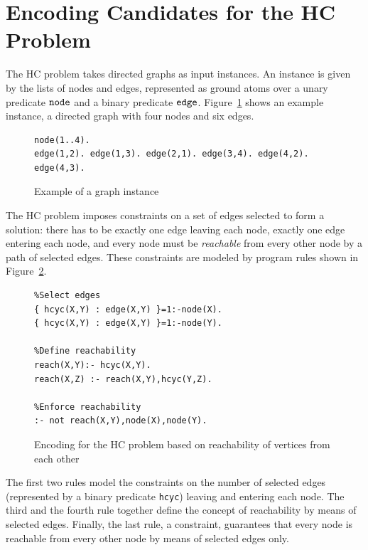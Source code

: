\documentclass{new_tlp}
\begin{document}
\section{Encoding Candidates for the HC Problem}
%
The HC problem takes directed graphs as input instances. An instance is given 
by the lists of nodes and edges, represented as ground atoms over a unary 
predicate $\tt{node}$ and a binary predicate $\tt{edge}$. Figure~\ref{graphinstance} shows
an example instance, a directed graph with four nodes and six edges.

\begin{figure}
\figrule
\begin{center}
\begin{verbatim}
node(1..4).
edge(1,2). edge(1,3). edge(2,1). edge(3,4). edge(4,2). edge(4,3).
\end{verbatim}
\end{center}
\caption{Example of a graph instance}\label{graphinstance}
\figrule
\end{figure}

The HC problem imposes constraints on a set of edges selected to form a 
solution: there has to be exactly one edge leaving each node, exactly one edge
entering each node, and every node must be \emph{reachable} from every other 
node by a path of selected edges. These constraints are modeled by program
rules shown in Figure~\ref{reachencod}.

\begin{figure}
\figrule
\begin{center}
\begin{verbatim}
%Select edges
{ hcyc(X,Y) : edge(X,Y) }=1:-node(X).
{ hcyc(X,Y) : edge(X,Y) }=1:-node(Y).

%Define reachability
reach(X,Y):- hcyc(X,Y).
reach(X,Z) :- reach(X,Y),hcyc(Y,Z).

%Enforce reachability
:- not reach(X,Y),node(X),node(Y).
\end{verbatim}
\end{center}
\caption{Encoding for the HC problem based on reachability of vertices from
each other}\label{reachencod}
\figrule
\end{figure}

The first two rules model the constraints on the number of selected edges 
(represented by a binary predicate {\tt hcyc}) leaving and entering each node. 
The third and the fourth rule together define the concept of reachability by 
means of selected edges. Finally, the last rule, a constraint, guarantees that
every node is reachable from every other node by means of selected edges only.
\end{document}
